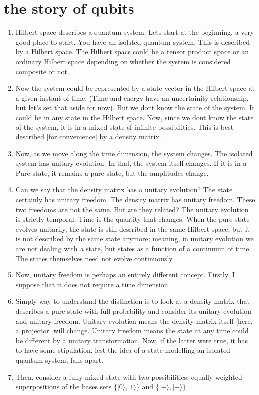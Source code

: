 \documentclass[a4paper,12pt]{amsbook}
\newcommand{\0}{{$|0\rangle$}}
\newcommand{\1}{{$|1\rangle$}}
\begin{document}
\section{the story of qubits}
\begin{enumerate}
    \item Hilbert space describes a quantum system: Lets start at the beginning, a very good place to start. You have an isolated quantum system. This is described by a Hilbert space. The Hilbert space could be a tensor product space or an ordinary Hilbert space depending on whether the system is considered composite or not. 
    \item Now the system could be represented by a state vector in the Hilbert space at a given instant of time. (Time and energy have an uncertainity relationship, but let's set that aside for now).  But we dont know the state of the system. It could be in any state in the Hilbert space. Now, since we dont know the state of the system, it is in a mixed state of infinite possibilities. This is best described [for convenience] by a density matrix. 
    \item Now, as we move along the time dimension, the system changes. The isolated system has unitary evolution. In that, the system itself changes. If it is in a Pure state, it remains a pure state, but the amplitudes change. 
    \item Can we say that the density matrix has a unitary evolution? The state certainly has unitary freedom. The density matrix has unitary freedom. These two freedoms are not the same. But are they related? The unitary evolution is strictly temporal. Time is the quantity that changes. When the pure state evolves unitarily, the state is still described in the same Hilbert space, but it is not described by the same state anymore; meaning, in unitary evolution we are not dealing with \textit{a} state, but states as a function of a continuum of time. The states themselves need not evolve continuously. 
    \item Now, unitary freedom is perhaps an entirely different concept. Firstly, I suppose that it does not require a time dimension. 
    \item Simply way to understand the distinction is to look at a density matrix that describes a pure state with full probability and consider its unitary evolution and unitary freedom. Unitary evolution means the density matrix itself [here, a projector] will change. Unitary freedom means the state at any time could be different by a unitary transformation. Now, if the latter were true, it has to have some stipulation, lest the idea of a state modelling an isolated quantum system, falls apart.
    \item Then, consider a fully mixed state with two possibilities: equally weighted superpositions of the bases sets $\{|0\rangle, |1\rangle \} \text{ and } \{ |+\rangle, |-\rangle \} $
\end{enumerate}
\end{document}
